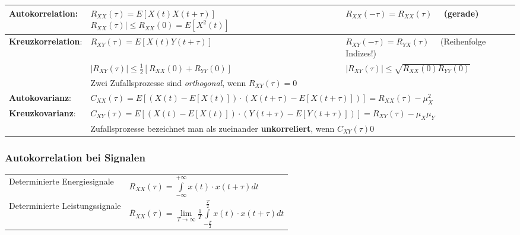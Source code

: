 \renewcommand{\arraystretch}{1.6}
\begin{tabular}[c]{|p{4cm}|p{6cm}|p{7.5cm}|}
	\hline
	\textbf{Autokorrelation}: 	&
		$R_{XX}(\tau) = E[X(t)X(t+\tau)]$\newline
  		$R_{XX}(\tau) \! \mid \leq R_{XX}(0) = E[X^{2}(t)]$ 
		&$R_{XX}(-\tau) = R_{XX}(\tau) \quad$ (gerade)\\
	\hline
  	\textbf{Kreuzkorrelation}: 	& 	
 		$R_{XY}(\tau) = E[X(t)Y(t+\tau)]$  
		& $R_{XY}(-\tau) = R_{YX}(\tau) \quad$ (Reihenfolge Indizes!) \\
		& $|R_{XY}(\tau)| \leq \frac{1}{2} \left[ R_{XX}(0)+R_{YY}(0)\right] $
		& $|R_{XY}(\tau)|  \leq \sqrt{R_{XX}(0)R_{YY}(0)}$ \\
		& \multicolumn{2}{l|}{Zwei Zufallsprozesse sind \textit{orthogonal}, wenn $R_{XY}(\tau) = 0$}\\
	\hline
  	\textbf{Autokovarianz}: 	&  
		\multicolumn{2}{l|}{$C_{XX}(\tau) = E\!\left[ \left( X(t)      - E[X(t)]      \right) \cdot
    	\left( X(t+\tau) - E[X(t+\tau)] \right) \right] =
   		R_{XX}(\tau) - \mu^{2}_{X} $} \\
   	\hline
  	\textbf{Kreuzkovarianz}: 	& 	
   		\multicolumn{2}{l|}{$C_{XY}(\tau) = E\!\left[ \left( X(t)      - E[X(t)]      \right) \cdot
        \left( Y(t+\tau) - E[Y(t+\tau)] \right) \right] = R_{XY}(\tau) - \mu_{X}\mu_{Y} $}\\
  	  	& \multicolumn{2}{l|}{Zufallsprozesse bezeichnet man als zueinander \textbf{unkorreliert}, wenn $C_{XY}(\tau)0$}\\
   	\hline
\end{tabular}
\renewcommand{\arraystretch}{1}

\subsubsection{Autokorrelation bei Signalen}
	\begin{tabular}[c]{ll}
		Determinierte Energiesignale 
		& $ R_{XX}(\tau) = \int\limits_{-\infty}^{+\infty} x(t) \cdot x(t+\tau) dt$ \\
		Determinierte Leistungssignale
		& $\overline{R}_{XX}(\tau) = \lim\limits_{T\rightarrow\infty}\frac{1}{T}\int\limits_{-\frac{T}{2}}^{\frac{T}{2}} x(t) \cdot x(t+\tau) dt$ \\
	\end{tabular}\\
	
